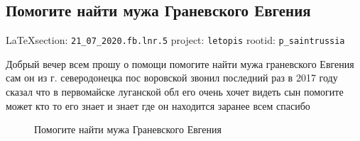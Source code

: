  
 
\subsection{Помогите найти мужа Граневского Евгения}
  
\vspace{0.5cm}
{\small\LaTeX section: \verb|21_07_2020.fb.lnr.5| project: \verb|letopis| rootid: \verb|p_saintrussia|}
\vspace{0.5cm}
 
Добрый вечер всем прошу о помощи помогите найти мужа граневского Евгения сам он
из г. северодонецка пос воровской звонил последний раз в 2017 году сказал что в
первомайске луганской обл его очень хочет видеть сын помогите может кто то его
знает и знает где он находится заранее всем спасибо

\begin{figure}[ht]
 \centering
 \caption{Помогите найти мужа Граневского Евгения}
 \label{fig:}
\end{figure}
